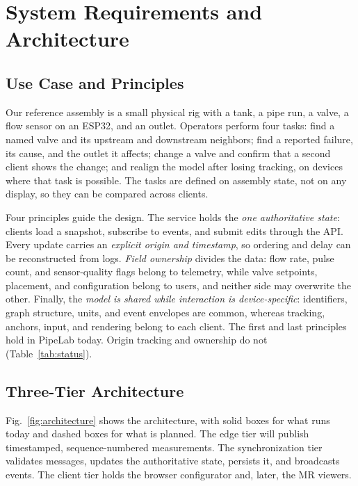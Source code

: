 \documentclass[conference]{IEEEtran}
\begin{document}
\section{System Requirements and Architecture}
\subsection{Use Case and Principles}
Our reference assembly is a small physical rig with a tank, a pipe run, a valve, a flow sensor on an ESP32, and an outlet. Operators perform four tasks: find a named valve and its upstream and downstream neighbors; find a reported failure, its cause, and the outlet it affects; change a valve and confirm that a second client shows the change; and realign the model after losing tracking, on devices where that task is possible. The tasks are defined on assembly state, not on any display, so they can be compared across clients.

Four principles guide the design. The service holds the \emph{one authoritative state}: clients load a snapshot, subscribe to events, and submit edits through the API. Every update carries an \emph{explicit origin and timestamp}, so ordering and delay can be reconstructed from logs. \emph{Field ownership} divides the data: flow rate, pulse count, and sensor-quality flags belong to telemetry, while valve setpoints, placement, and configuration belong to users, and neither side may overwrite the other. Finally, the \emph{model is shared while interaction is device-specific}: identifiers, graph structure, units, and event envelopes are common, whereas tracking, anchors, input, and rendering belong to each client. The first and last principles hold in PipeLab today. Origin tracking and ownership do not (Table~\ref{tab:status}).

\subsection{Three-Tier Architecture}
Fig.~\ref{fig:architecture} shows the architecture, with solid boxes for what runs today and dashed boxes for what is planned. The edge tier will publish timestamped, sequence-numbered measurements. The synchronization tier validates messages, updates the authoritative state, persists it, and broadcasts events. The client tier holds the browser configurator and, later, the MR viewers.
\end{document}
